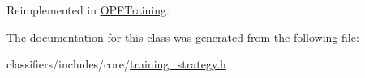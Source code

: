 Reimplemented in \hyperlink{classOPFTraining_a78dd33b07207dd08914a6cce6eaa7d9d}{O\+P\+F\+Training}.



The documentation for this class was generated from the following file\+:\begin{DoxyCompactItemize}
\item 
classifiers/includes/core/\hyperlink{training__strategy_8h}{training\+\_\+strategy.\+h}\end{DoxyCompactItemize}
